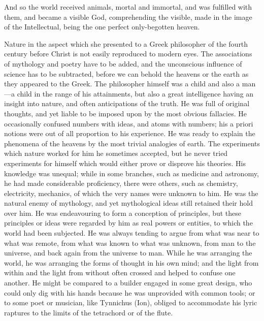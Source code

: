 And so the world received animals, mortal and immortal, and was fulfilled
with them, and became a visible God, comprehending the visible, made in
the image of the Intellectual, being the one perfect only-begotten heaven.


Nature in the aspect which she presented to a Greek philosopher of the
fourth century before Christ is not easily reproduced to modern eyes. The
associations of mythology and poetry have to be added, and the unconscious
influence of science has to be subtracted, before we can behold the
heavens or the earth as they appeared to the Greek. The philosopher
himself was a child and also a man—a child in the range of his
attainments, but also a great intelligence having an insight into nature,
and often anticipations of the truth. He was full of original thoughts,
and yet liable to be imposed upon by the most obvious fallacies. He
occasionally confused numbers with ideas, and atoms with numbers; his a
priori notions were out of all proportion to his experience. He was ready
to explain the phenomena of the heavens by the most trivial analogies of
earth. The experiments which nature worked for him he sometimes accepted,
but he never tried experiments for himself which would either prove or
disprove his theories. His knowledge was unequal; while in some branches,
such as medicine and astronomy, he had made considerable proficiency,
there were others, such as chemistry, electricity, mechanics, of which the
very names were unknown to him. He was the natural enemy of mythology, and
yet mythological ideas still retained their hold over him. He was
endeavouring to form a conception of principles, but these principles or
ideas were regarded by him as real powers or entities, to which the world
had been subjected. He was always tending to argue from what was near to
what was remote, from what was known to what was unknown, from man to the
universe, and back again from the universe to man. While he was arranging
the world, he was arranging the forms of thought in his own mind; and the
light from within and the light from without often crossed and helped to
confuse one another. He might be compared to a builder engaged in some
great design, who could only dig with his hands because he was unprovided
with common tools; or to some poet or musician, like Tynnichus (Ion),
obliged to accommodate his lyric raptures to the limits of the tetrachord
or of the flute.

